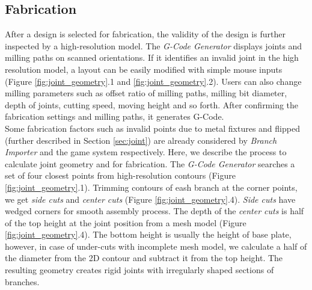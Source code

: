 \subsection{Fabrication}
\label{sec:fabrication}
After a design is selected for fabrication, the validity of the design is further inspected by a high-resolution model.
The \textit{G-Code Generator} displays joints and milling paths on scanned orientations.
If it identifies an invalid joint in the high resolution model, a layout can be easily modified with simple mouse inputs (Figure \ref{fig:joint_geometry}.1 and \ref{fig:joint_geometry}.2).
Users can also change milling parameters such as offset ratio of milling paths, milling bit diameter, depth of joints, cutting speed, moving height and so forth.
After confirming the fabrication settings and milling paths, it generates G-Code.\\

Some fabrication factors such as invalid points due to metal fixtures and flipped (further described in Section \ref{sec:joint}) are already considered by \textit{Branch Importer} and the game system respectively.
Here, we describe the process to calculate joint geometry and for fabrication.
The \textit{G-Code Generator} searches a set of four closest points from high-resolution contours (Figure \ref{fig:joint_geometry}.1).
Trimming contours of eash branch at the corner points, we get \textit{side cuts} and \textit{center cuts} (Figure \ref{fig:joint_geometry}.4).
\textit{Side cuts} have wedged corners for smooth assembly process.
The depth of the \textit{center cuts} is half of the top height at the joint position from a mesh model (Figure \ref{fig:joint_geometry}.4).
The bottom height is usually the height of base plate, however, in case of under-cuts with incomplete mesh model, we calculate a half of the diameter from the 2D contour and subtract it from the top height.
The resulting geometry creates rigid joints with irregularly shaped sections of branches.



